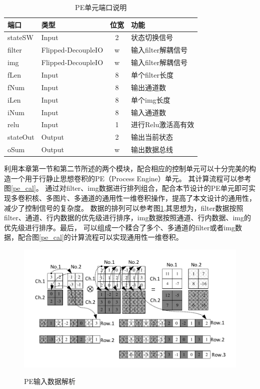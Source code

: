 \begin{table}[h] %
    \centering
    \caption{PE单元端口说明} %
    \begin{tabular}{l|l|c|l} %
    \hline  
    \hline  
    端口 & 类型 & 位宽 & 功能 \\ %
    \hline %
    stateSW & Input & 2 & 状态切换信号 \\
    \hline  
    filter & Flipped-DecoupleIO & w & 输入filter解耦信号 \\
    \hline  
    img & Flipped-DecoupleIO & w & 输入filter解耦信号 \\
    \hline  
    fLen & Input & 8 & 单个filter长度 \\
    \hline  
    fNum & Input & 8 & 输出通道数 \\
    \hline  
    iLen & Input & 8 & 单个img长度 \\
    \hline  
    iNum & Input & 8 & 输入通道数 \\
    \hline  
    relu & Input & 1 & 进行Relu激活高有效 \\
    \hline  
    stateOut & Output & 2 & 输出当前状态 \\
    \hline  
    oSum & Output & w & 输出数据总线 \\
    \hline  
    \hline  
    \end{tabular}  
\end{table}  
利用本章第一节和第二节所述的两个模块，配合相应的控制单元可以十分完美的构造一个用于行静止思想卷积的PE（Process Engine）单元。
其计算流程可以参考图\ref{pe_cal}。
通过对filter、img数据进行排列组合，配合本节设计的PE单元即可实现多卷积核、多图片、多通道的通用性一维卷积操作，提高了本文设计的通用性，减少了控制信号的复杂度。
数据的排列可以参考图\ref{pe_data},其思想为，filter数据按照filter、通道、行内数据的优先级进行排序，img数据按照通道、行内数据、img的优先级进行排序。最后，
可以组成一个糅合了多个、多通道的filter或者img数据，配合图\ref{pe_cal}的计算流程可以实现通用性一维卷积。
\begin{figure}[h]
    \centering
    \includegraphics{../pdf/data.pdf}\\
    \caption{PE输入数据解析}
    \label{pe_data}
\end{figure}
